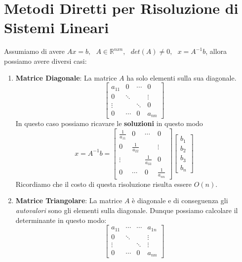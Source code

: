 \documentclass{article}
\begin{document}
\newpage

\section{Metodi Diretti per Risoluzione di Sistemi Lineari}

Assumiamo di avere $Ax = b, \: \: \: A\in \mathbb{R}^{nxn}, \: \: \: det(A)\neq0, \: \: \: x = A^{-1}b$, allora possiamo avere diversi casi:

\begin{enumerate}
    \item \textbf{Matrice Diagonale}: La matrice $A$ ha solo elementi sulla sua diagonale.
    \[ 
    \begin{bmatrix}
    a_{11} & 0 & \cdots  & 0\\
    0 & \ddots &  & \vdots \\
     \vdots &  & \ddots &  0\\
     0 & \cdots & 0 & a_{nn}
    \end{bmatrix} 
    \]
    In questo caso possiamo ricavare le \textbf{soluzioni} in questo modo
    \[ x = A^{-1}b = \begin{bmatrix}
    \frac{1}{a_{11}} & 0 & \cdots  & 0\\
    0 & \frac{1}{a_{22}} &  & \vdots \\
     \vdots &  & \frac{1}{a_{33}} &  0\\
     0& \cdots & 0 & \frac{1}{a_{nn}}
    \end{bmatrix}
    \begin{bmatrix}
    b_{1}\\    
    b_{2}\\
    b_{3}\\
    b_{n}
    \end{bmatrix}  \]
    Ricordiamo che il costo di questa risoluzione risulta essere $O(n)$.
    \item \textbf{Matrice Triangolare}: La matrice $A$ è diagonale e di conseguenza gli \textit{autovalori} sono gli elementi sulla diagonale. Dunque possiamo calcolare il determinante in questo modo:
    \vspace*{10px}
    \[
    \begin{bmatrix}
        a_{11} & \cdots & \cdots  & a_{1n} \\
        0 & \ddots &  & \vdots \\
            \vdots &  & \ddots &  \vdots \\
        0 & \cdots & 0 & a_{nn}
    \end{bmatrix} 
\]
\end{enumerate}
\end{document}
